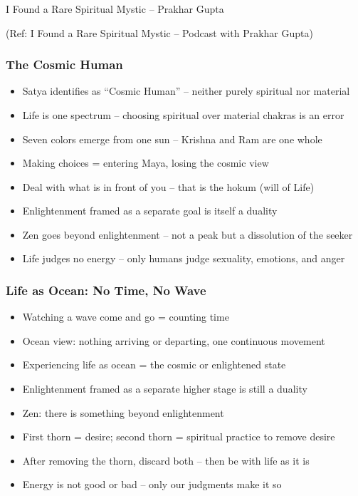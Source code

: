 \begin{frame}[fragile]\frametitle{}
\begin{center}
{\Large I Found a Rare Spiritual Mystic -- Prakhar Gupta}
\end{center}

{\tiny (Ref: I Found a Rare Spiritual Mystic -- Podcast with Prakhar Gupta)}

\end{frame}

\begin{frame}[fragile]\frametitle{The Cosmic Human}
  \begin{itemize}
    \item Satya identifies as ``Cosmic Human'' -- neither purely spiritual nor material
    \item Life is one spectrum -- choosing spiritual over material chakras is an error
    \item Seven colors emerge from one sun -- Krishna and Ram are one whole
    \item Making choices = entering Maya, losing the cosmic view
    \item Deal with what is in front of you -- that is the hokum (will of Life)
    \item Enlightenment framed as a separate goal is itself a duality
    \item Zen goes beyond enlightenment -- not a peak but a dissolution of the seeker
    \item Life judges no energy -- only humans judge sexuality, emotions, and anger
  \end{itemize}
\end{frame}

\begin{frame}[fragile]\frametitle{Life as Ocean: No Time, No Wave}
  \begin{itemize}
    \item Watching a wave come and go = counting time
    \item Ocean view: nothing arriving or departing, one continuous movement
    \item Experiencing life as ocean = the cosmic or enlightened state
    \item Enlightenment framed as a separate higher stage is still a duality
    \item Zen: there is something beyond enlightenment
    \item First thorn = desire; second thorn = spiritual practice to remove desire
    \item After removing the thorn, discard both -- then be with life as it is
    \item Energy is not good or bad -- only our judgments make it so
  \end{itemize}
\end{frame}

